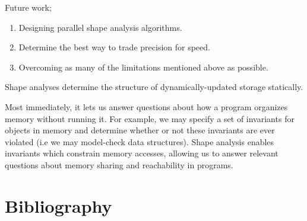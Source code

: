 \documentclass{article}
\begin{document}
Future work;
\begin{enumerate}[1.]
    \item Designing parallel shape analysis algorithms.
    \item Determine the best way to trade precision for speed.
    \item Overcoming as many of the limitations mentioned above as possible.
\end{enumerate}

Shape analyses determine the structure of dynamically-updated storage
statically.

Most immediately, it lets us answer questions about how a program organizes
memory without running it. For example, we may specify a set of invariants
for objects in memory and determine whether or not these invariants are ever
violated (i.e we may model-check data structures). Shape analysis enables
invariants which constrain memory accesses, allowing us to answer relevant
questions about memory sharing and reachability in programs.

\section{Bibliography}
\end{document}
